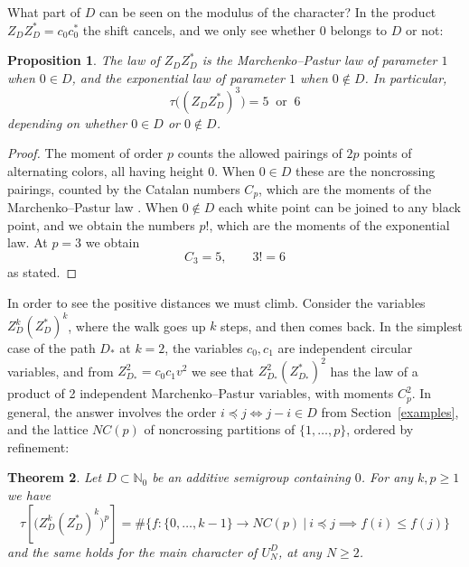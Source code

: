 \documentclass[11pt,a4paper]{article}
\newtheorem{thm}{Theorem}[section]
\newtheorem{prop}[thm]{Proposition}
\begin{document}
What part of $D$ can be seen on the modulus of the character? In the product $Z_DZ_D^*=c_0c_0^*$ the shift cancels, and we only see whether $0$ belongs to $D$ or not:

\begin{prop}\label{modulus-law}
The law of $Z_DZ_D^*$ is the Marchenko--Pastur law of parameter $1$ when $0\in D$, and the exponential law of parameter $1$ when $0\notin D$. In particular,
\[
 \tau\big((Z_DZ_D^*)^3\big)=5\ \text{ or }\ 6
\]
depending on whether $0\in D$ or $0\notin D$.
\end{prop}

\begin{proof}
The moment of order $p$ counts the allowed pairings of $2p$ points of alternating colors, all having height $0$. When $0\in D$ these are the noncrossing pairings, counted by the Catalan numbers $C_p$, which are the moments of the Marchenko--Pastur law \cite{ns}. When $0\notin D$ each white point can be joined to any black point, and we obtain the numbers $p!$, which are the moments of the exponential law. At $p=3$ we obtain
\[
 C_3=5,\qquad3!=6
\]
as stated.
\end{proof}

In order to see the positive distances we must climb. Consider the variables $Z_D^k(Z_D^*)^k$, where the walk goes up $k$ steps, and then comes back. In the simplest case of the path $D_*$ at $k=2$, the variables $c_0,c_1$ are independent circular variables, and from $Z_{D_*}^2=c_0c_1v^2$ we see that $Z_{D_*}^2(Z_{D_*}^*)^2$ has the law of a product of 2 independent Marchenko--Pastur variables, with moments $C_p^2$. In general, the answer involves the order $i\preceq j\iff j-i\in D$ from Section~\ref{examples}, and the lattice $NC(p)$ of noncrossing partitions of $\{1,\ldots,p\}$, ordered by refinement:

\begin{thm}\label{order-maps}
Let $D\subset\mathbb N_0$ be an additive semigroup containing $0$. For any $k,p\geq1$ we have
\[
 \tau\!\left[\bigl(Z_D^k(Z_D^*)^k\bigr)^p\right]=\#\Big\{f:\{0,\ldots,k-1\}\to NC(p)\ \Big|\ i\preceq j\implies f(i)\leq f(j)\Big\}
\]
and the same holds for the main character of $U_N^D$, at any $N\geq2$.
\end{thm}
\end{document}
